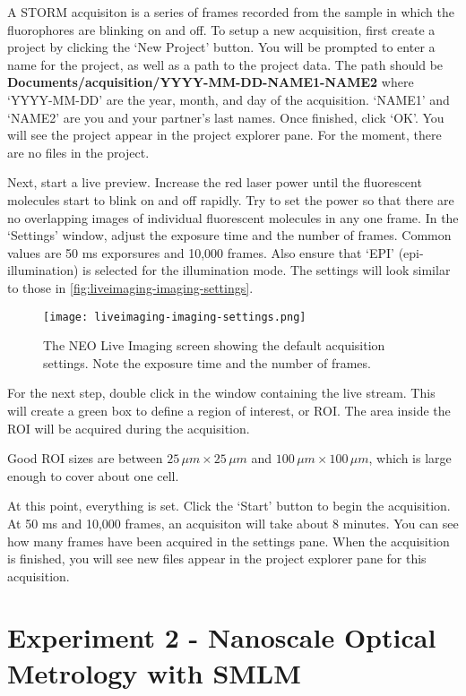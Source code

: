\documentclass[10pt,a4paper,oneside]{book}
\begin{document}
A STORM acquisiton is a series of frames recorded from the sample in which the fluorophores are blinking on and off. To setup a new acquisition, first create a project by clicking the `New Project' button. You will be prompted to enter a name for the project, as well as a path to the project data. The path should be \textbf{Documents/acquisition/YYYY-MM-DD-NAME1-NAME2} where `YYYY-MM-DD' are the year, month, and day of the acquisition. `NAME1' and `NAME2' are you and your partner's last names. Once finished, click `OK'. You will see the project appear in the project explorer pane. For the moment, there are no files in the project.

Next, start a live preview. Increase the red laser power until the fluorescent molecules start to blink on and off rapidly. Try to set the power so that there are no overlapping images of individual fluorescent molecules in any one frame. In the `Settings' window, adjust the exposure time and the number of frames. Common values are 50 ms exporsures and 10,000 frames. Also ensure that `EPI' (epi-illumination) is selected for the illumination mode. The settings will look similar to those in \autoref{fig:liveimaging-imaging-settings}.

\begin{figure}[ht]
    \centering
    \texttt{[image: liveimaging-imaging-settings.png]}
    \caption{The NEO Live Imaging screen showing the default acquisition settings. Note the exposure time and the number of frames.}
    \label{fig:liveimaging-imaging-settings}
\end{figure}

For the next step, double click in the window containing the live stream. This will create a green box to define a region of interest, or ROI. The area inside the ROI will be acquired during the acquisition.

\newline

Good ROI sizes are between $25 \, \mu m\times 25 \, \mu m$ and $100 \, \mu m\times 100 \, \mu m$, which is large enough to cover about one cell.

At this point, everything is set. Click the `Start' button to begin the acquisition. At 50 ms and 10,000 frames, an acquisiton will take about 8 minutes. You can see how many frames have been acquired in the settings pane. When the acquisition is finished, you will see new files appear in the project explorer pane for this acquisition.

\section{Experiment 2 - Nanoscale Optical Metrology with SMLM}
\end{document}
